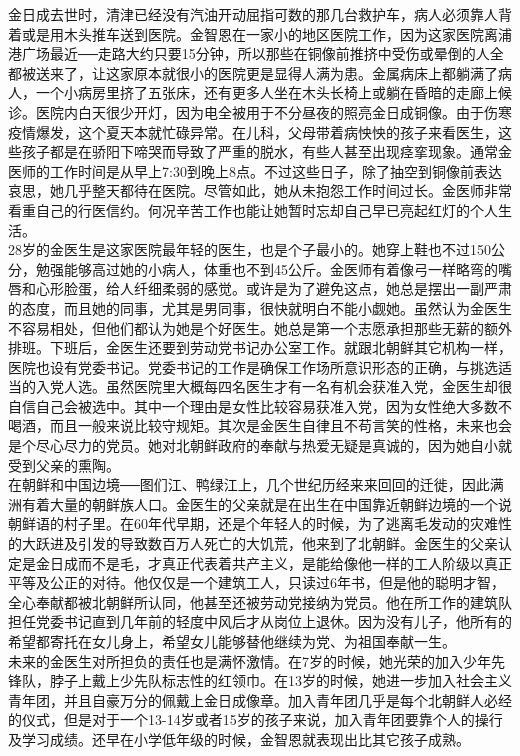 \ifnum{}
	\begin{multicols}{\theparacolNo}
\fi
金日成去世时，清津已经没有汽油开动屈指可数的那几台救护车，病人必须靠人背着或是用木头推车送到医院。金智恩在一家小的地区医院工作，因为这家医院离浦港广场最近──走路大约只要15分钟，所以那些在铜像前推挤中受伤或晕倒的人全都被送来了，让这家原本就很小的医院更是显得人满为患。金属病床上都躺满了病人，一个小病房里挤了五张床，还有更多人坐在木头长椅上或躺在昏暗的走廊上候诊。医院内白天很少开灯，因为电全被用于不分昼夜的照亮金日成铜像。由于伤寒疫情爆发，这个夏天本就忙碌异常。在儿科，父母带着病怏怏的孩子来看医生，这些孩子都是在骄阳下啼哭而导致了严重的脱水，有些人甚至出现痉挛现象。通常金医师的工作时间是从早上7:30到晚上8点。不过这些日子，除了抽空到铜像前表达哀思，她几乎整天都待在医院。尽管如此，她从未抱怨工作时间过长。金医师非常看重自己的行医信约。何况辛苦工作也能让她暂时忘却自己早已亮起红灯的个人生活。\\

28岁的金医生是这家医院最年轻的医生，也是个子最小的。她穿上鞋也不过150公分，勉强能够高过她的小病人，体重也不到45公斤。金医师有着像弓一样略弯的嘴唇和心形脸蛋，给人纤细柔弱的感觉。或许是为了避免这点，她总是摆出一副严肃的态度，而且她的同事，尤其是男同事，很快就明白不能小觑她。虽然认为金医生不容易相处，但他们都认为她是个好医生。她总是第一个志愿承担那些无薪的额外排班。下班后，金医生还要到劳动党书记办公室工作。就跟北朝鲜其它机构一样，医院也设有党委书记。党委书记的工作是确保工作场所意识形态的正确，与挑选适当的入党人选。虽然医院里大概每四名医生才有一名有机会获准入党，金医生却很自信自己会被选中。其中一个理由是女性比较容易获准入党，因为女性绝大多数不喝酒，而且一般来说比较守规矩。其次是金医生自律且不苟言笑的性格，未来也会是个尽心尽力的党员。她对北朝鲜政府的奉献与热爱无疑是真诚的，因为她自小就受到父亲的熏陶。\\

在朝鲜和中国边境──图们江、鸭绿江上，几个世纪历经来来回回的迁徙，因此满洲有着大量的朝鲜族人口。金医生的父亲就是在出生在中国靠近朝鲜边境的一个说朝鲜语的村子里。在60年代早期，还是个年轻人的时候，为了逃离毛发动的灾难性的大跃进及引发的导致数百万人死亡的大饥荒，他来到了北朝鲜。金医生的父亲认定是金日成而不是毛，才真正代表着共产主义，是能给像他一样的工人阶级以真正平等及公正的对待。他仅仅是一个建筑工人，只读过6年书，但是他的聪明才智，全心奉献都被北朝鲜所认同，他甚至还被劳动党接纳为党员。他在所工作的建筑队担任党委书记直到几年前的轻度中风后才从岗位上退休。因为没有儿子，他所有的希望都寄托在女儿身上，希望女儿能够替他继续为党、为祖国奉献一生。\\

未来的金医生对所担负的责任也是满怀激情。在7岁的时候，她光荣的加入少年先锋队，脖子上戴上少先队标志性的红领巾。在13岁的时候，她进一步加入社会主义青年团，并且自豪万分的佩戴上金日成像章。加入青年团几乎是每个北朝鲜人必经的仪式，但是对于一个13-14岁或者15岁的孩子来说，加入青年团要靠个人的操行及学习成绩。还早在小学低年级的时候，金智恩就表现出比其它孩子成熟。\\


\end{multicols}
